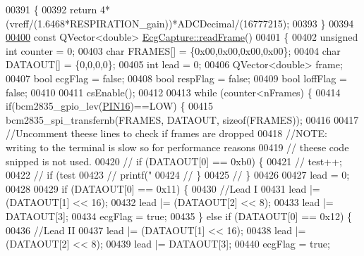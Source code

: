 \begin{DoxyCode}
00391 \{
00392     \textcolor{keywordflow}{return} 4*(vreff/(1.6468*RESPIRATION\_gain))*ADCDecimal/(16777215);
00393 \}
00394 
\hypertarget{ecgcapture_8cpp_source.tex_l00400}{}\hyperlink{group__Device-Facade_ga644ec3752de6ee1e818b5fcd1de5decd}{00400} \textcolor{keyword}{const} QVector<double> \hyperlink{group__Device-Facade_ga644ec3752de6ee1e818b5fcd1de5decd}{EcgCapture::readFrame}()
00401 \{
00402     \textcolor{keywordtype}{unsigned} \textcolor{keywordtype}{int} counter = 0;
00403     \textcolor{keywordtype}{char} FRAMES[] = \{0x00,0x00,0x00,0x00\};
00404     \textcolor{keywordtype}{char} DATAOUT[] = \{0,0,0,0\};
00405     \textcolor{keywordtype}{int} lead = 0;
00406     QVector<double> frame;
00407     \textcolor{keywordtype}{bool} ecgFlag = \textcolor{keyword}{false};
00408     \textcolor{keywordtype}{bool} respFlag = \textcolor{keyword}{false};
00409     \textcolor{keywordtype}{bool} loffFlag = \textcolor{keyword}{false};
00410 
00411     csEnable();
00412 
00413     \textcolor{keywordflow}{while} (counter<nFrames) \{
00414         \textcolor{keywordflow}{if}(bcm2835\_gpio\_lev(\hyperlink{ecgcapture_8cpp_aa8a0f35acb2789eeeecec0b656a199b0}{PIN16})==LOW) \{
00415             bcm2835\_spi\_transfernb(FRAMES, DATAOUT, \textcolor{keyword}{sizeof}(FRAMES));
00416 
00417             \textcolor{comment}{//Uncomment theese lines to check if frames are dropped}
00418             \textcolor{comment}{//NOTE: writing to the terminal is slow so for performance reasons}
00419             \textcolor{comment}{//      theese code snipped is not used.}
00420 \textcolor{comment}{//            if (DATAOUT[0] == 0xb0) \{}
00421 \textcolor{comment}{//                test++;}
00422 \textcolor{comment}{//                if (test%
00423 \textcolor{comment}{//                    printf("%
00424 \textcolor{comment}{//                \}}
00425 \textcolor{comment}{//            \}}
00426 
00427             lead = 0;
00428 
00429             \textcolor{keywordflow}{if} (DATAOUT[0] == 0x11) \{
00430                 \textcolor{comment}{//Lead I}
00431                 lead |= (DATAOUT[1] << 16);
00432                 lead |= (DATAOUT[2] << 8);
00433                 lead |= DATAOUT[3];
00434                 ecgFlag = \textcolor{keyword}{true};
00435             \} \textcolor{keywordflow}{else} \textcolor{keywordflow}{if} (DATAOUT[0] == 0x12) \{
00436                 \textcolor{comment}{//Lead II}
00437                 lead |= (DATAOUT[1] << 16);
00438                 lead |= (DATAOUT[2] << 8);
00439                 lead |= DATAOUT[3];
00440                 ecgFlag = \textcolor{keyword}{true};
}}
\end{DoxyCode}
